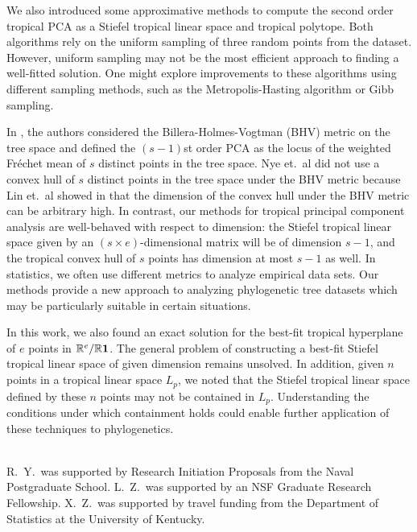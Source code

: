 \documentclass[12pt]{extarticle}
\numberwithin{theorem}{section}
\newcommand{\RR}{\mathbb{R}}
\begin{document}
We also introduced some approximative methods to compute the
second order tropical PCA as a Stiefel tropical linear space and tropical polytope. Both algorithms rely on the uniform sampling of three random points from
the dataset.  However, uniform sampling may not be the most efficient approach to
finding a well-fitted solution. One might explore improvements to
these algorithms using different sampling methods, such as the
Metropolis-Hasting algorithm or Gibb sampling. \cite{ZYCH}

 In \cite{NTWY}, the authors
considered the Billera-Holmes-Vogtman (BHV) \cite{BHV} metric on the
tree space and defined the $(s-1)$st order PCA as the {locus of the weighted Fr\'echet 
  mean} of $s$ distinct points in the tree space. %
Nye et.~al did not use a
convex hull of $s$ distinct points in the tree space under the BHV
metric because Lin et.~al showed in \cite{LSTY} that the dimension of
the convex hull under the BHV metric can be
arbitrary high. In contrast, our methods for tropical principal
component analysis are well-behaved with respect to dimension: the
Stiefel tropical linear space given by an $(s\times e)$-dimensional
matrix will be of dimension $s-1$, and the tropical convex hull of $s$
points has dimension at most $s-1$ as well. \cite[Theorem 5.3.23]{MS} In
statistics, we often use different metrics to analyze
empirical data sets.  Our methods provide a new approach to analyzing phylogenetic tree datasets which may be particularly suitable in certain situations. 

In this work, we also found an exact solution for the best-fit tropical hyperplane of $e$ points in $\RR^e/\RR {\bf 1}$. The general problem of constructing a best-fit Stiefel tropical linear space of given dimension remains unsolved. In addition, given $n$ points in a tropical linear space $L_p$, we noted that the Stiefel tropical linear space defined by these $n$ points may not be contained in $L_p$. Understanding the conditions under which containment holds could enable further application of these techniques to phylogenetics.

\smallskip

\smallskip \\
R.~Y.~was supported by Research Initiation Proposals from the Naval
Postgraduate School.  L.~Z.~was supported by an NSF Graduate Research Fellowship. X.~Z.~was supported
by travel funding from the Department of Statistics at the University
of Kentucky.
\end{document}
